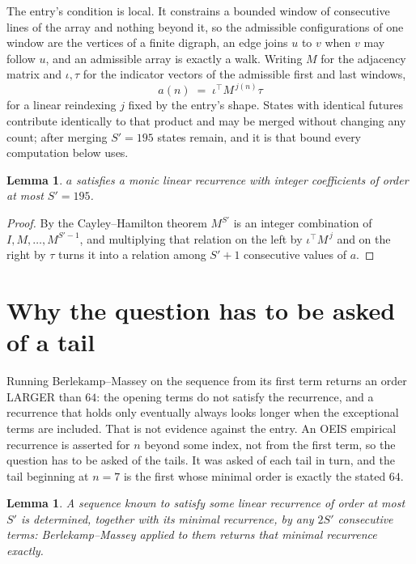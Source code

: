 \documentclass[11pt,a4paper]{article}
\theoremstyle{plain}
\newtheorem{lemma}[theorem]{Lemma}
\theoremstyle{definition}
\begin{document}
The entry's condition is local. It constrains a bounded window of consecutive lines of the
array and nothing beyond it, so the admissible configurations of one window are the vertices of
a finite digraph, an edge joins $u$ to $v$ when $v$ may follow $u$, and an admissible array is
exactly a walk. Writing $M$ for the adjacency matrix and $\iota,\tau$ for the indicator vectors
of the admissible first and last windows,
\[
a(n)\;=\;\iota^{\!\top}M^{\,j(n)}\tau
\]
for a linear reindexing $j$ fixed by the entry's shape. States with identical futures
contribute identically to that product and may be merged without changing any count; after
merging $S'=195$ states remain, and it is that bound every computation below uses.

\begin{lemma}\label{lem:cf}
$a$ satisfies a monic linear recurrence with integer coefficients of order at most $S'=195$.
\end{lemma}

\begin{proof}
By the Cayley--Hamilton theorem $M^{S'}$ is an integer combination of $I,M,\dots,M^{S'-1}$,
and multiplying that relation on the left by $\iota^{\!\top}M^{\,j}$ and on the right by
$\tau$ turns it into a relation among $S'+1$ consecutive values of $a$.
\end{proof}

\section{Why the question has to be asked of a tail}

Running Berlekamp--Massey on the sequence from its first term returns an order LARGER than $64$: the opening terms do not satisfy the recurrence, and a recurrence that holds only eventually always looks longer when the exceptional terms are included. That is not evidence against the entry. An OEIS empirical recurrence is asserted for $n$ beyond some index, not from the first term, so the question has to be asked of the tails. It was asked of each tail in turn, and the tail beginning at $n=7$ is the first whose minimal order is exactly the stated $64$.

\begin{lemma}\label{lem:bm}
A sequence known to satisfy some linear recurrence of order at most $S'$ is determined,
together with its minimal recurrence, by any $2S'$ consecutive terms: Berlekamp--Massey applied
to them returns that minimal recurrence exactly.
\end{lemma}
\end{document}
